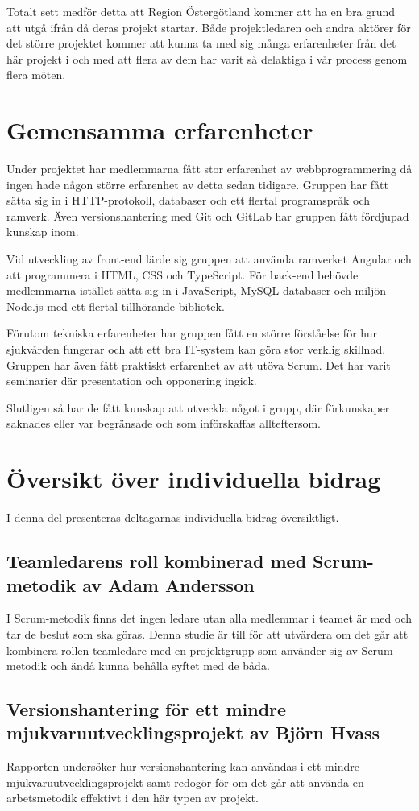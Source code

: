 Totalt sett medför detta att Region Östergötland kommer att ha en bra grund att utgå ifrån då deras projekt startar. Både projektledaren och andra aktörer för det större projektet kommer att kunna ta med sig många erfarenheter från det här projekt i och med att flera av dem har varit så delaktiga i vår process genom flera möten.

\section{Gemensamma erfarenheter}
Under projektet har medlemmarna fått stor erfarenhet av webbprogrammering då ingen hade någon större erfarenhet av detta sedan tidigare. Gruppen har fått sätta sig in i HTTP-protokoll, databaser och ett flertal programspråk och ramverk. Även versionshantering med Git och GitLab har gruppen fått fördjupad kunskap inom.

Vid utveckling av front-end lärde sig gruppen att använda ramverket Angular och att programmera i HTML, CSS och TypeScript. För back-end behövde medlemmarna istället sätta sig in i JavaScript, MySQL-databaser och miljön Node.js med ett flertal tillhörande bibliotek.

Förutom tekniska erfarenheter har gruppen fått en större förståelse för hur sjukvården fungerar och att ett bra IT-system kan göra stor verklig skillnad. Gruppen har även fått praktiskt erfarenhet av att utöva Scrum. Det har varit seminarier där presentation och opponering ingick.

Slutligen så har de fått kunskap att utveckla något i grupp, där förkunskaper saknades eller var begränsade och som införskaffas allteftersom.

\section{Översikt över individuella bidrag}
I denna del presenteras deltagarnas individuella bidrag översiktligt.

\subsection{Teamledarens roll kombinerad med Scrum-metodik av Adam Andersson}
I Scrum-metodik finns det ingen ledare utan alla medlemmar i teamet är med och tar de beslut som ska göras. Denna studie är till för att utvärdera om det går att kombinera rollen teamledare med en projektgrupp som använder sig av Scrum-metodik och ändå kunna behålla syftet med de båda.
\subsection{Versionshantering för ett mindre mjukvaruutvecklingsprojekt av Björn Hvass}
Rapporten undersöker hur versionshantering kan användas i ett mindre mjukvaruutvecklingsprojekt samt redogör för om det går att använda en arbetsmetodik effektivt i den här typen av projekt.

